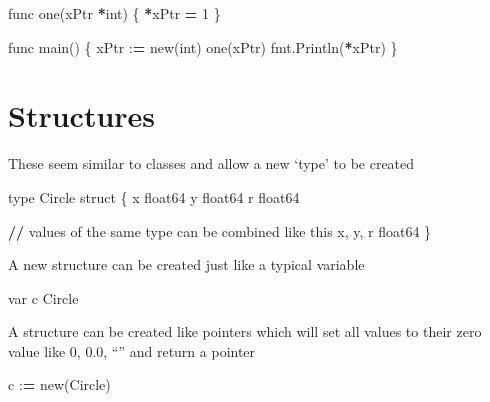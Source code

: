 \documentclass[]{book}
\newenvironment{Shaded}{\begin{snugshade}}{\end{snugshade}}
\newcommand{\DecValTok}[1]{\textcolor[rgb]{0.00,0.00,0.81}{#1}}
\newcommand{\OperatorTok}[1]{\textcolor[rgb]{0.81,0.36,0.00}{\textbf{#1}}}
\newcommand{\BuiltInTok}[1]{#1}
\newcommand{\NormalTok}[1]{#1}
\begin{document}
\begin{Shaded}
\begin{Highlighting}[]
\NormalTok{func one(xPtr }\OperatorTok{*}\BuiltInTok{int}\NormalTok{) \{}
    \OperatorTok{*}\NormalTok{xPtr }\OperatorTok{=} \DecValTok{1}        
\NormalTok{\}}
                    
\NormalTok{func main() \{                                                                                                                 }
\NormalTok{    xPtr :}\OperatorTok{=}\NormalTok{ new(}\BuiltInTok{int}\NormalTok{)                                                }
\NormalTok{    one(xPtr)                                                       }
\NormalTok{    fmt.Println(}\OperatorTok{*}\NormalTok{xPtr)                                              }
\NormalTok{\}                                                                   }
\end{Highlighting}
\end{Shaded}

\section{Structures}\label{structures}

These seem similar to classes and allow a new `type' to be created

\begin{Shaded}
\begin{Highlighting}[]
\BuiltInTok{type}\NormalTok{ Circle struct \{}
\NormalTok{x float64}
\NormalTok{y float64}
\NormalTok{r float64}

    \OperatorTok{//}\NormalTok{ values of the same }\BuiltInTok{type}\NormalTok{ can be combined like this}
\NormalTok{    x, y, r float64 }
\NormalTok{\}                   }
\end{Highlighting}
\end{Shaded}

A new structure can be created just like a typical variable

\begin{Shaded}
\begin{Highlighting}[]
\NormalTok{var c Circle}
\end{Highlighting}
\end{Shaded}

A structure can be created like pointers which will set all values to
their zero value like 0, 0.0, ``'' and return a pointer

\begin{Shaded}
\begin{Highlighting}[]
\NormalTok{c :}\OperatorTok{=}\NormalTok{ new(Circle)}
\end{Highlighting}
\end{Shaded}
\end{document}
